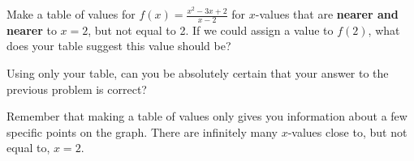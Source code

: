 \documentclass{ximera}
\begin{document}
\begin{problem}
	Make a table of values for $f(x) = \frac{x^2-3x+2}{x-2}$ for $x$-values that are \textbf{nearer and nearer} to $x = 2$, but not equal to 2.  If we could assign a value to $f(2)$, what does your table suggest this value should be?
	\begin{problem}
		Using only your table, can you be absolutely certain that your answer to the previous problem is correct?
		\begin{multipleChoice}
		\end{multipleChoice}
		\begin{feedback}
			Remember that making a table of values only gives you information about a few specific points on the graph.  There are infinitely many $x$-values close to, but not equal to, $x = 2$.
		\end{feedback}
	\end{problem}
\end{problem}



\end{document}
